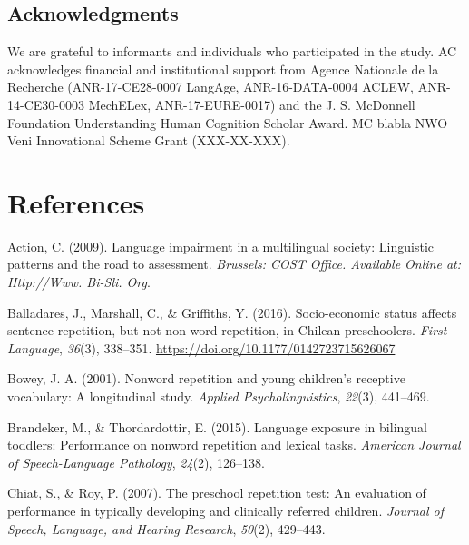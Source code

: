 \documentclass[english,,man,floatsintext]{apa6}
\begin{document}
\newpage

\hypertarget{acknowledgments}{%
\subsection{Acknowledgments}\label{acknowledgments}}

We are grateful to informants and individuals who participated in the study. AC acknowledges financial and institutional support from Agence Nationale de la Recherche (ANR-17-CE28-0007 LangAge, ANR-16-DATA-0004 ACLEW, ANR-14-CE30-0003 MechELex, ANR-17-EURE-0017) and the J. S. McDonnell Foundation Understanding Human Cognition Scholar Award. MC blabla NWO Veni Innovational Scheme Grant (XXX-XX-XXX).

\hypertarget{references}{%
\section{References}\label{references}}

\setlength{\parindent}{-0.5in}
\setlength{\leftskip}{0.5in}

\hypertarget{refs}{}
\leavevmode\hypertarget{ref-is08042009language}{}%
Action, C. (2009). Language impairment in a multilingual society: Linguistic patterns and the road to assessment. \emph{Brussels: COST Office. Available Online at: Http://Www. Bi-Sli. Org}.

\leavevmode\hypertarget{ref-balladares2016socio}{}%
Balladares, J., Marshall, C., \& Griffiths, Y. (2016). Socio-economic status affects sentence repetition, but not non-word repetition, in Chilean preschoolers. \emph{First Language}, \emph{36}(3), 338--351. \url{https://doi.org/10.1177/0142723715626067}

\leavevmode\hypertarget{ref-bowey2001nonword}{}%
Bowey, J. A. (2001). Nonword repetition and young children's receptive vocabulary: A longitudinal study. \emph{Applied Psycholinguistics}, \emph{22}(3), 441--469.

\leavevmode\hypertarget{ref-brandeker2015language}{}%
Brandeker, M., \& Thordardottir, E. (2015). Language exposure in bilingual toddlers: Performance on nonword repetition and lexical tasks. \emph{American Journal of Speech-Language Pathology}, \emph{24}(2), 126--138.

\leavevmode\hypertarget{ref-chiat2007preschool}{}%
Chiat, S., \& Roy, P. (2007). The preschool repetition test: An evaluation of performance in typically developing and clinically referred children. \emph{Journal of Speech, Language, and Hearing Research}, \emph{50}(2), 429--443.
\end{document}
